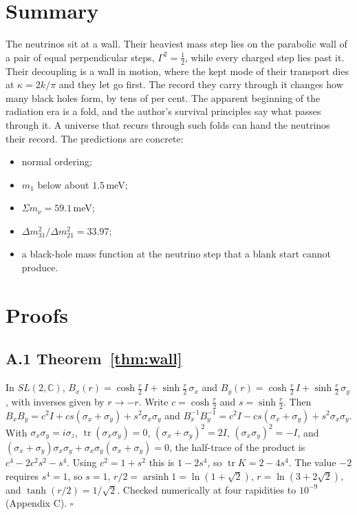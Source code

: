 \documentclass[11pt]{article}
\theoremstyle{definition}\newtheorem{hypothesis}{Hypothesis}\newtheorem{prediction}{Prediction}
\theoremstyle{remark}\newtheorem{remark}[theorem]{Remark}
\begin{document}
\section{Summary}
The neutrinos sit at a wall. Their heaviest mass step lies on the parabolic wall of a pair of equal perpendicular steps, $\Gamma^2=\tfrac12$, while every charged step lies past it. Their decoupling is a wall in motion, where the kept mode of their transport dies at $\kappa=2k/\pi$ and they let go first. The record they carry through it changes how many black holes form, by tens of per cent. The apparent beginning of the radiation era is a fold, and the author's survival principles say what passes through it. A universe that recurs through such folds can hand the neutrinos their record. The predictions are concrete:
\begin{itemize}[nosep]
\item normal ordering;
\item $m_1$ below about $1.5$\,meV;
\item $\Sigma m_\nu=59.1$\,meV;
\item $\Delta m^2_{31}/\Delta m^2_{21}=33.97$;
\item a black-hole mass function at the neutrino step that a blank start cannot produce.
\end{itemize}

\appendix
\section{Proofs}
\subsection*{A.1 Theorem~\ref{thm:wall}}
In $SL(2,\mathbb C)$, $B_x(r)=\cosh\tfrac r2\,I+\sinh\tfrac r2\,\sigma_x$ and $B_y(r)=\cosh\tfrac r2\,I+\sinh\tfrac r2\,\sigma_y$, with inverses given by $r\to-r$. Write $c=\cosh\tfrac r2$ and $s=\sinh\tfrac r2$. Then $B_xB_y=c^2I+cs(\sigma_x+\sigma_y)+s^2\sigma_x\sigma_y$ and $B_x^{-1}B_y^{-1}=c^2I-cs(\sigma_x+\sigma_y)+s^2\sigma_x\sigma_y$. With $\sigma_x\sigma_y=i\sigma_z$, $\operatorname{tr}(\sigma_x\sigma_y)=0$, $(\sigma_x+\sigma_y)^2=2I$, $(\sigma_x\sigma_y)^2=-I$, and $(\sigma_x+\sigma_y)\sigma_x\sigma_y+\sigma_x\sigma_y(\sigma_x+\sigma_y)=0$, the half-trace of the product is $c^4-2c^2s^2-s^4$. Using $c^2=1+s^2$ this is $1-2s^4$, so $\operatorname{tr}K=2-4s^4$. The value $-2$ requires $s^4=1$, so $s=1$, $r/2=\operatorname{arsinh}1=\ln(1+\sqrt2)$, $r=\ln(3+2\sqrt2)$, and $\tanh(r/2)=1/\sqrt2$. Checked numerically at four rapidities to $10^{-9}$ (Appendix C). $\square$
\end{document}
